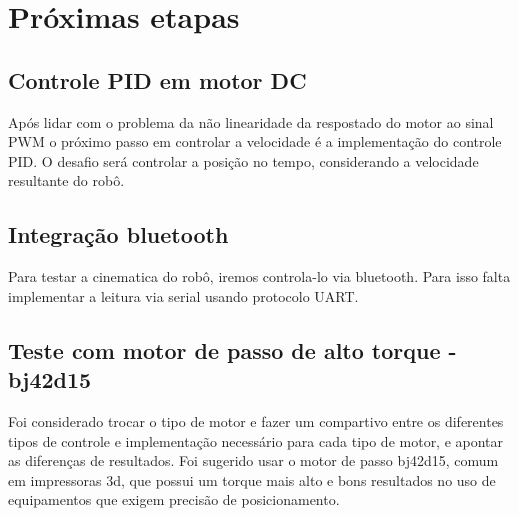 
\chapter{Próximas etapas}

\section{Controle PID em motor DC}
Após lidar com o problema da não linearidade da respostado do motor ao sinal PWM
o próximo passo em controlar a velocidade é a implementação do controle PID.
O desafio será controlar a posição no tempo, considerando a velocidade resultante do robô.

\section{Integração bluetooth}
Para testar a cinematica do robô, iremos controla-lo via bluetooth. Para isso falta implementar a 
leitura via serial usando protocolo UART.

\section{Teste com motor de passo de alto torque - bj42d15}
Foi considerado trocar o tipo de motor e fazer um compartivo entre os diferentes tipos de 
controle e implementação necessário para cada tipo de motor,
e apontar as diferenças de resultados.
Foi sugerido usar o motor de passo bj42d15, comum em impressoras 3d,
que possui um torque mais alto e bons resultados no uso de equipamentos que exigem precisão de posicionamento.